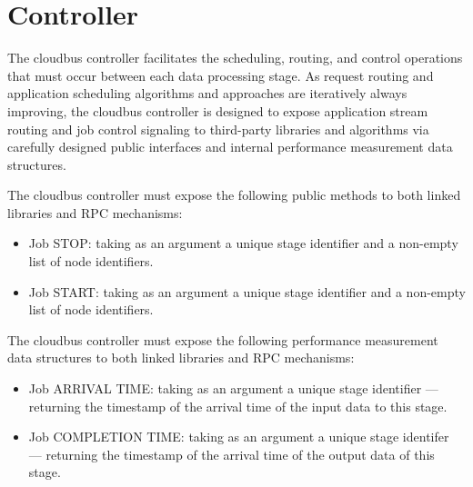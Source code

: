 \section{\AppName Controller}
The cloudbus controller facilitates the scheduling, routing, and control operations that must occur between each data processing stage. As %
request routing and application scheduling algorithms and approaches are iteratively always improving, the cloudbus controller %
is designed to expose application stream routing and job control signaling to third-party libraries and algorithms via carefully %
designed public interfaces and internal performance measurement data structures.

The cloudbus controller must expose the following public methods to both linked libraries and RPC mechanisms:
\begin{itemize}
	\item Job STOP: taking as an argument a unique stage identifier and a non-empty list of node identifiers.
	\item Job START: taking as an argument a unique stage identifier and a non-empty list of node identifiers.
\end{itemize}

The cloudbus controller must expose the following performance measurement data structures to both linked libraries and RPC mechanisms:
\begin{itemize}
	\item Job ARRIVAL TIME: taking as an argument a unique stage identifier --- returning the timestamp of the arrival time of the input %
	data to this stage.
	\item Job COMPLETION TIME: taking as an argument a unique stage identifer --- returning the timestamp of the arrival time of the %
	output data of this stage.
\end{itemize}